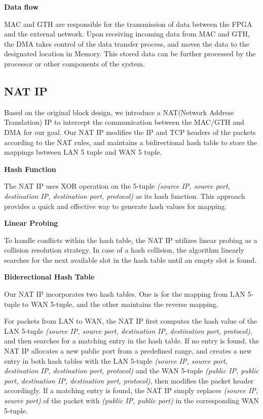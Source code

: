     \textbf{Data flow}\

    MAC and GTH are responsible for the transmission of data between the FPGA and the external network. Upon receiving incoming data from MAC and GTH, the DMA takes control of the data transfer process, and moves the data to the designated location in Memory. This stored data can be further processed by the processor or other components of the system.

\subsection{NAT IP}

    Based on the original block design, we introduce a NAT(Network Address Translation) IP to intercept the communication between the MAC/GTH and DMA for our goal. Our NAT IP modifies the IP and TCP headers of the packets according to the NAT rules, and maintains a bidirectional hash table to store the mappings between LAN 5 tuple and WAN 5 tuple.

    \textbf{Hash Function}\

    The NAT IP uses XOR operation on the 5-tuple \emph{(source IP, source port, destination IP, destination port, protocol)} as its hash function. This approach provides a quick and effective way to generate hash values for mapping.

    \textbf{Linear Probing}\

    To handle conflicts within the hash table, the NAT IP utilizes linear probing as a collision resolution strategy. In case of a hash collision, the algorithm linearly searches for the next available slot in the hash table until an empty slot is found.

    \textbf{Biderectional Hash Table}\

    Our NAT IP incorporates two hash tables. One is for the mapping from LAN 5-tuple to WAN 5-tuple, and the other maintains the reverse mapping.

    For packets from LAN to WAN, the NAT IP first computes the hash value of the LAN 5-tuple \emph{(source IP, source port, destination IP, destination port, protocol)}, and then searches for a matching entry in the hash table. If no entry is found, the NAT IP allocates a new public port from a predefined range, and creates a new entry in both hash tables with the LAN 5-tuple \emph{(source IP, source port, destination IP, destination port, protocol)} and the WAN 5-tuple \emph{(public IP, public port, destination IP, destination port, protocol)}, then modifies the packet header accordingly. If a matching entry is found, the NAT IP simply replaces \emph{(source IP,  source port)} of the packet with \emph{(public IP, public port)} in the corresponding WAN 5-tuple.

